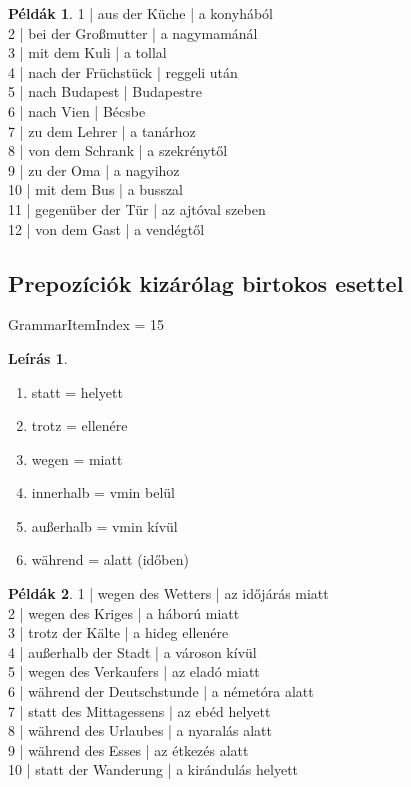 \documentclass{article}
\theoremstyle{definition}
\newtheorem*{exmp}{Példák}
\newtheorem*{desc}{Leírás}
\begin{document}
\begin{exmp}
1 | aus der Küche | a konyhából\\
2 | bei der Großmutter | a nagymamánál\\
3 | mit dem Kuli | a tollal\\
4 | nach der Früchstück | reggeli után\\
5 | nach Budapest | Budapestre\\
6 | nach Vien | Bécsbe\\
7 | zu dem Lehrer | a tanárhoz\\
8 | von dem Schrank | a szekrénytől\\
9 | zu der Oma | a nagyihoz\\
10 | mit dem Bus | a busszal\\
11 | gegenüber der Tür | az ajtóval szeben\\
12 | von dem Gast | a vendégtől\\
\end{exmp}

\subsection{Prepozíciók kizárólag birtokos esettel}

GrammarItemIndex = 15

\begin{desc}
\begin{enumerate}
\item statt = helyett
\item trotz = ellenére
\item wegen = miatt
\item innerhalb = vmin belül
\item außerhalb = vmin kívül
\item während = alatt (időben)
\end{enumerate}
\end{desc}

\begin{exmp}
1 | wegen des Wetters | az időjárás miatt\\
2 | wegen des Kriges | a háború miatt\\
3 | trotz der Kälte | a hideg ellenére\\
4 | außerhalb der Stadt | a városon kívül\\
5 | wegen des Verkaufers | az eladó miatt\\
6 | während der Deutschstunde | a németóra alatt\\
7 | statt des Mittagessens | az ebéd helyett\\
8 | während des Urlaubes | a nyaralás alatt\\
9 | während des Esses | az étkezés alatt\\
10 | statt der Wanderung | a kirándulás helyett\\
\end{exmp}
\end{document}
